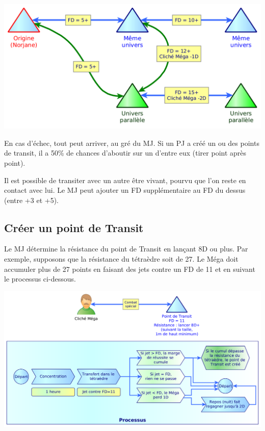 \documentclass[11pt]{article}
\begin{document}
\begin{center}
\includegraphics[scale=0.3]{04-transit}
\end{center}

En cas d'échec, tout peut arriver, au gré du MJ. Si un PJ a créé un ou des points de transit, il a 50\% de chances d'aboutir sur un d'entre eux (tirer point après point).

Il est possible de transiter avec un autre être vivant, pourvu que l'on reste en contact avec lui. Le MJ peut ajouter un FD supplémentaire au FD du dessus (entre +3 et +5).

\subsection{Créer un point de Transit}

Le MJ détermine la résistance du point de Transit en lançant 8D ou plus. Par exemple, supposons que la résistance du tétraèdre soit de 27. Le Méga doit accumuler plus de 27 points en faisant des jets contre un FD de 11 et en suivant le processus ci-dessous.


\begin{center}
\includegraphics[scale=0.28]{05-point-transit}
\end{center}
\end{document}
